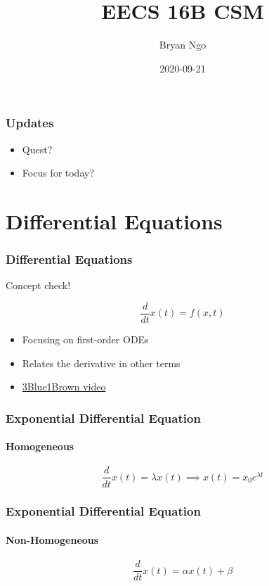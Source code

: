 \documentclass[aspectratio=169]{beamer}
\title{EECS 16B CSM}
\author{Bryan Ngo}
\date{2020-09-21}
\institute{Computer Science Mentors}
\newcommand{\diff}[1]{\frac{d}{d #1}}
\begin{document}
\begin{frame}
    \maketitle
\end{frame}

\begin{frame}
    \frametitle{Updates}

    \begin{itemize}
        \item Quest?
        \item Focus for today?
    \end{itemize}
\end{frame}

\section{Differential Equations}

\begin{frame}
    \frametitle{Differential Equations}

    Concept check! \pause

    \begin{equation}
        \diff{t} x(t) = f(x, t)
    \end{equation}
    \begin{itemize}
        \item Focusing on first-order ODEs
        \item Relates the derivative in other terms
        \item \href{https://youtu.be/p_di4Zn4wz4?list=PLZHQObOWTQDNPOjrT6KVlfJuKtYTftqH6}{3Blue1Brown video}
    \end{itemize}
\end{frame}

\begin{frame}
    \frametitle{Exponential Differential Equation}
    \framesubtitle{Homogeneous}

    \begin{equation}
        \diff{t} x(t) = \lambda x(t) \implies x(t) = x_0 e^{\lambda t}
    \end{equation}
\end{frame}

\begin{frame}
    \frametitle{Exponential Differential Equation}
    \framesubtitle{Non-Homogeneous}

    \begin{equation}
        \diff{t} x(t) = \alpha x(t) + \beta
    \end{equation}
\end{frame}
\end{document}
